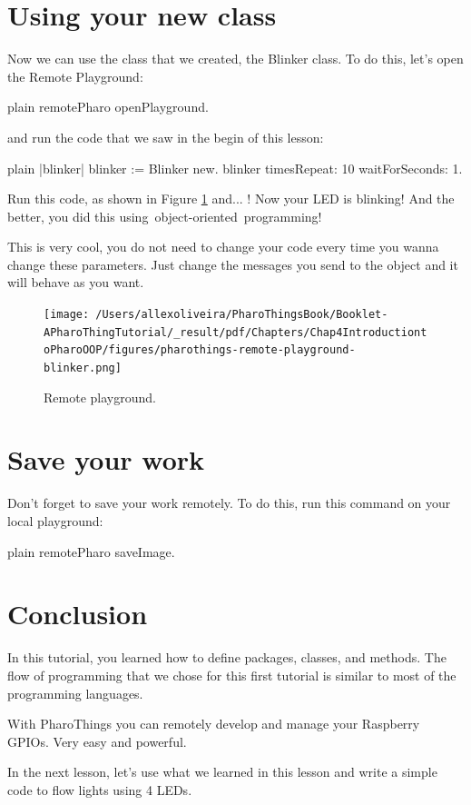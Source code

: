 \documentclass[10pt,twoside,english]{_support/latex/sbabook/sbabook}
\begin{document}
\section{Using your new class}
Now we can use the class that we created, the Blinker class. To do this, let's open the Remote Playground:

\begin{displaycode}{plain}
remotePharo openPlayground.
\end{displaycode}

and run the code that we saw in the begin of this lesson:

\begin{displaycode}{plain}
|blinker|
blinker := Blinker new. 
blinker timesRepeat: 10 waitForSeconds: 1.
\end{displaycode}

Run this code, as shown in Figure \ref{RemotePlayground} and... ! Now your LED is blinking! And the better, you did this using object-oriented programming! 

This is very cool, you do not need to change your code every time you wanna change these parameters. Just change the messages you send to the object and it will behave as you want.


\begin{figure}

\begin{center}
\texttt{[image: /Users/allexoliveira/PharoThingsBook/Booklet-APharoThingTutorial/\_result/pdf/Chapters/Chap4IntroductiontoPharoOOP/figures/pharothings-remote-playground-blinker.png]}\caption{Remote playground.\label{RemotePlayground}}\end{center}
\end{figure}

\section{Save your work}
Don't forget to save your work remotely. To do this, run this command on your local playground:

\begin{displaycode}{plain}
remotePharo saveImage.
\end{displaycode}
\section{Conclusion}
In this tutorial, you learned how to define packages, classes, and methods. The flow of programming that we chose for this first tutorial is similar to most of the programming languages.

With PharoThings you can remotely develop and manage your Raspberry GPIOs. Very easy and powerful.

In the next lesson, let’s use what we learned in this lesson and write a simple code to flow lights using 4 LEDs.


\backmatter

\end{document}
